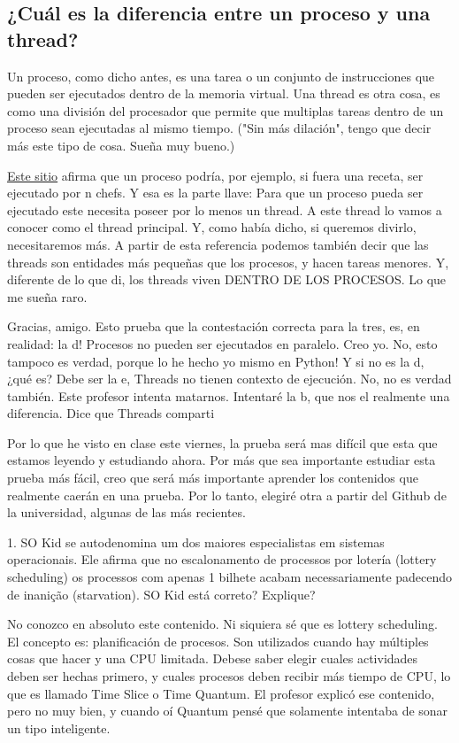 \subsection{¿Cuál es la diferencia entre un proceso y una thread?}
Un proceso, como dicho antes, es una tarea o un conjunto de instrucciones que pueden ser ejecutados dentro de la memoria virtual.
Una thread es otra cosa, es como una división del procesador que permite que multiplas tareas dentro de un proceso sean ejecutadas al mismo tiempo.
("Sin más dilación", tengo que decir más este tipo de cosa. Sueña muy bueno.)

\href{https://codigofacilito.com/articulos/threads-procesos}{Este sitio} afirma que un
proceso podría, por ejemplo, si fuera una receta, ser ejecutado por n chefs. Y esa es la parte llave:
Para que un proceso pueda ser ejecutado este necesita poseer por lo menos un thread.
A este thread lo vamos a conocer como el thread principal.
Y, como había dicho, si queremos divirlo, necesitaremos más. A partir de esta referencia podemos también decir que las threads
son entidades más pequeñas que los procesos, y hacen tareas menores. Y, diferente de lo que di, los threads
viven DENTRO DE LOS PROCESOS. Lo que me sueña raro.

Gracias, amigo. Esto prueba que la contestación correcta para la tres, es, en realidad:
la d! Procesos no pueden ser ejecutados en paralelo. Creo yo. No, esto tampoco es verdad, porque lo he hecho yo mismo en Python!
Y si no es la d, ¿qué es? Debe ser la e, Threads no tienen contexto de ejecución. No, no es verdad también.
Este profesor intenta matarnos. Intentaré la b, que nos el realmente una diferencia. Dice que Threads comparti

Por lo que he visto en clase este viernes, la prueba será mas difícil que esta que estamos leyendo y estudiando ahora.
Por más que sea importante estudiar esta prueba más fácil, creo que será más importante aprender los contenidos que realmente caerán en una prueba.
Por lo tanto, elegiré otra a partir del Github de la universidad, algunas de las más recientes.


1. SO Kid se autodenomina um dos maiores especialistas em sistemas operacionais. Ele afirma que no
escalonamento de processos por lotería (lottery scheduling) os processos com apenas 1 bilhete
acabam necessariamente padecendo de inanição (starvation). SO Kid está correto? Explique?

No conozco en absoluto este contenido. Ni siquiera sé que es lottery scheduling. El concepto es: planificación de procesos.
Son utilizados cuando hay múltiples cosas que hacer y una CPU limitada. Debese saber elegir cuales actividades deben ser hechas primero, y cuales
procesos deben recibir más tiempo de CPU, lo que es llamado Time Slice o Time Quantum. El profesor explicó ese contenido, pero no muy bien, y cuando oí Quantum pensé que
solamente intentaba de sonar un tipo inteligente.

